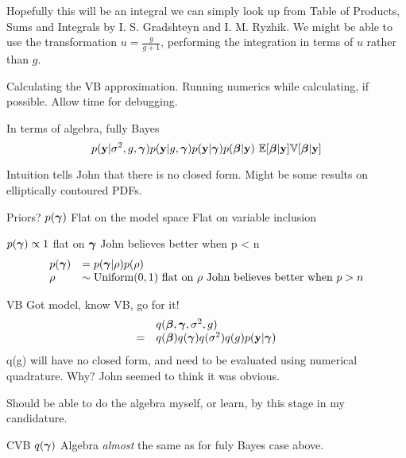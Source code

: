 \documentclass{amsart}
\begin{document}
Hopefully this will be an integral we can simply look up from Table of Products, Sums and Integrals by
I. S. Gradshteyn and I. M. Ryzhik. We might be able to use the transformation $u = \frac{g}{g + 1}$,
performing the integration in terms of $u$ rather than $g$.

Calculating the VB approximation.
Running numerics while calculating, if possible.
Allow time for debugging.

In terms of algebra, fully Bayes
\begin{equation*}
p({\bf y} | \sigma^2, g, {\boldsymbol \gamma})
p({\bf y} | g, {\boldsymbol \gamma})
p({\bf y} | {\boldsymbol \gamma})
p({\boldsymbol \beta} | {\bf y}) \
{\mathbb E}[{\boldsymbol \beta} | {\bf y}]
{\mathbb V}[{\boldsymbol \beta} | {\bf y}]
\end{equation*}

Intuition tells John that there is no closed form. Might be some results on elliptically contoured PDFs.

Priors?
$p({\boldsymbol \gamma})$ Flat on the model space
Flat on variable inclusion

$p({\boldsymbol \gamma}) \propto 1$ flat on ${\boldsymbol \gamma}$ John believes better when p < n
\begin{equation*}
\begin{array}{ll}
p({\boldsymbol \gamma}) &= p({\boldsymbol \gamma} | \rho) p(\rho) \\
\rho &\sim \text{Uniform}(0, 1) \text{ flat on $\rho$ John believes better when $p > n$}
\end{array}
\end{equation*}

VB Got model, know VB, go for it!
\begin{equation*}
\begin{array}{ll}
&q({\boldsymbol \beta}, {\boldsymbol \gamma}, \sigma^2, g) \\
= &q({\boldsymbol \beta}) q({\boldsymbol \gamma}) q(\sigma^2) q(g) p({\bf y} | {\boldsymbol \gamma})
\end{array}
\end{equation*}
q(g) will have no closed form, and need to be evaluated using numerical quadrature. Why? John seemed to think
it was obvious.

Should be able to do the algebra myself, or learn, by this stage in my candidature.

CVB $q({\boldsymbol \gamma})$
Algebra \emph{almost} the same as for fuly Bayes case above.
\end{document}
